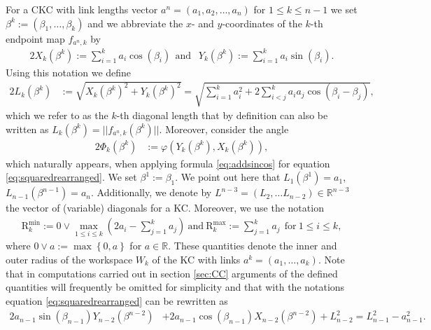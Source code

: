 \documentclass[10pt,a4paper]{article}
\theoremstyle{definition}
\theoremstyle{remark}
\numberwithin{equation}{section}
\newcommand{\R}{\mathbb{R}}
\begin{document}
For a CKC with link lengths vector $a^n = (a_1, a_2, \dots, a_n)$ for $1\leq k \leq n-1$ we set $\beta^{k} := (\beta_1, \dots, \beta_{k})$ and we abbreviate the $x$- and $y$-coordinates of the $k$-th endpoint map $f_{a^n,k}$ by    
\begin{alignat}{2}\label{eq:coordinates}
X_k(\beta^k):=  \sum_{i=1}^k a_i \cos(\beta_i)~~ \text{and }~~ Y_k(\beta^k) :=  \sum_{i=1}^k a_i \sin(\beta_i).
\end{alignat}
Using this notation we define 
\begin{alignat*}{2}
L_{k}\left(\beta^{k} \right) 	&:= \sqrt{X_k(\beta^k)^2  + Y_k(\beta^k)^2  }  =  \sqrt{ \sum_{i=1}^{k} a_i^2 +     2 \sum_{i< j}^{k} a_i a_j \cos\left(\beta_i - \beta_j\right)},
\end{alignat*}
which we refer to as the $k$-th diagonal length that  by definition can also be written as  $ L_k(  \beta^{k} ) =  || f_{a^n, k}(\beta^k)||$. Moreover, consider the angle  \begin{alignat*}{2}
\Phi_k \left(\beta^{k}\right)	&:= \varphi \left(  Y_k\left( \beta^k \right),  X_k\left( \beta^k \right)     \right), \end{alignat*}
which naturally appears, when applying formula \eqref{eq:addsincos} for equation \eqref{eq:squaredrearranged}. We set $\beta^1 := \beta_1$. We point out here that $L_1\left( \beta^1 \right) = a_1$, $L_{n-1}\left( \beta^{n-1} \right) = a_n$. Additionally, we denote by $L^{n-3} = (L_2, \dots L_{n-2}) \in \R^{n-3}$ the vector of (variable) diagonals for a KC. Moreover, we use the notation 
\begin{align}\label{eq:RmincmaxA}
\mathrm{R}_{k}^{\min}   := 0 \vee  \max_{1\leq i\leq k}\left(2a_i-\sum_{j=1}^ka_j\right) ~ \text{and}~ \mathrm{    R}_{k}^{\max} :=      \sum_{j=1}^ka_j  ~~\text{for}~1\leq i\leq k, 
\end{align} 
where $0 \vee a := \max\left\{ 0, a \right\}$ for $a\in \R$. These quantities denote the inner and outer radius of the workspace $W_k$ of the KC with links $a^k = (a_1, \dots, a_k)$. Note that in computations carried out in section \ref{sec:CC} arguments of the defined quantities will frequently be omitted for simplicity and that with the notations equation \eqref{eq:squaredrearranged} can be rewritten as
\begin{align}\label{eq:SQshort}
2 a_{n-1} \sin\left( \beta_{n-1} \right) Y_{n-2}\left( \beta^{n-2} \right)  &+ 2a_{n-1} \cos\left( \beta_{n-1} \right) X_{n-2}\left( \beta^{n-2} \right) +  L_{n-2}^2 =  L_{n-1}^2 - a_{n-1}^2.  
\end{align}
\end{document}
